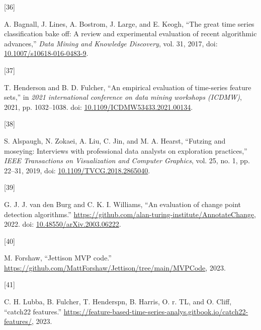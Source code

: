 \documentclass{article}
\newlength{\cslhangindent}
\newlength{\csllabelwidth}
\newlength{\cslentryspacingunit} %
\newenvironment{CSLReferences}[2] %
 {%
  \setlength{\parindent}{0pt}
  \ifodd #1
  \let\oldpar\par
  \def\par{\hangindent=\cslhangindent\oldpar}
  \fi
  \setlength{\parskip}{#2\cslentryspacingunit}
 }%
 {}
\newcommand{\CSLLeftMargin}[1]{\parbox[t]{\csllabelwidth}{#1}}
\newcommand{\CSLRightInline}[1]{\parbox[t]{\linewidth - \csllabelwidth}{#1}\break}
\begin{document}
\begin{CSLReferences}{0}{0}
\leavevmode{}%
\CSLLeftMargin{{[}36{]} }
\CSLRightInline{A. Bagnall, J. Lines, A. Bostrom, J. Large, and E.
Keogh, {``The great time series classification bake off: A review and
experimental evaluation of recent algorithmic advances,''} \emph{Data
Mining and Knowledge Discovery}, vol. 31, 2017, doi:
\href{https://doi.org/10.1007/s10618-016-0483-9}{10.1007/s10618-016-0483-9}.}

\leavevmode{}%
\CSLLeftMargin{{[}37{]} }
\CSLRightInline{T. Henderson and B. D. Fulcher, {``An empirical
evaluation of time-series feature sets,''} in \emph{2021 international
conference on data mining workshops (ICDMW)}, 2021, pp. 1032--1038. doi:
\href{https://doi.org/10.1109/ICDMW53433.2021.00134}{10.1109/ICDMW53433.2021.00134}.}

\leavevmode{}%
\CSLLeftMargin{{[}38{]} }
\CSLRightInline{S. Alspaugh, N. Zokaei, A. Liu, C. Jin, and M. A.
Hearst, {``Futzing and moseying: Interviews with professional data
analysts on exploration practices,''} \emph{IEEE Transactions on
Visualization and Computer Graphics}, vol. 25, no. 1, pp. 22--31, 2019,
doi:
\href{https://doi.org/10.1109/TVCG.2018.2865040}{10.1109/TVCG.2018.2865040}.}

\leavevmode{}%
\CSLLeftMargin{{[}39{]} }
\CSLRightInline{G. J. J. van den Burg and C. K. I. Williams, {``An
evaluation of change point detection algorithms.''}
\url{https://github.com/alan-turing-institute/AnnotateChange}, 2022.
doi:
\href{https://doi.org/10.48550/arXiv.2003.06222}{10.48550/arXiv.2003.06222}.}

\leavevmode{}%
\CSLLeftMargin{{[}40{]} }
\CSLRightInline{M. Forshaw, {``Jettison MVP code.''}
\url{https://github.com/MattForshaw/Jettison/tree/main/MVPCode}, 2023.}

\leavevmode{}%
\CSLLeftMargin{{[}41{]} }
\CSLRightInline{C. H. Lubba, B. Fulcher, T. Henderspn, B. Harris, O. r.
TL, and O. Cliff, {``catch22 features.''}
\url{https://feature-based-time-series-analys.gitbook.io/catch22-features/},
2023.}

\end{CSLReferences}



\end{document}
